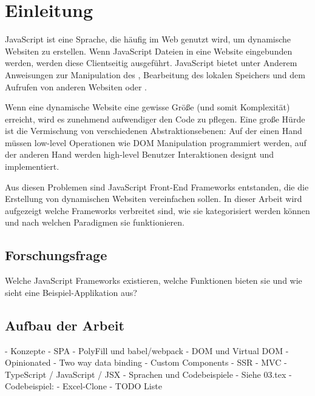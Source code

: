 \newpage
\section{Einleitung} \label{Einleitung}

JavaScript ist eine Sprache, die häufig im Web genutzt wird, um dynamische
Websiten zu erstellen. Wenn JavaScript Dateien in eine Website eingebunden
werden, werden diese Clientseitig ausgeführt. JavaScript bietet unter Anderem
Anweisungen zur Manipulation des , Bearbeitung des lokalen Speichers und dem
Aufrufen von anderen Websiten oder .

Wenn eine dynamische Website eine gewisse Größe (und somit Komplexität)
erreicht, wird es zunehmend aufwendiger den Code zu pflegen. Eine große Hürde
ist die Vermischung von verschiedenen Abstraktionsebenen: Auf der einen Hand
müssen low-level Operationen wie DOM Manipulation programmiert werden, auf der
anderen Hand werden high-level Benutzer Interaktionen designt und implementiert.

Aus diesen Problemen sind JavaScript Front-End Frameworks entstanden, die die
Erstellung von dynamischen Websiten vereinfachen sollen. In dieser Arbeit wird
aufgezeigt welche Frameworks verbreitet sind, wie sie kategorisiert werden
können und nach welchen Paradigmen sie funktionieren.

\subsection{Forschungsfrage}

Welche JavaScript Frameworks existieren, welche Funktionen bieten sie und wie
sieht eine Beispiel-Applikation aus?

\subsection{Aufbau der Arbeit}

- Konzepte
  - SPA
  - PolyFill und babel/webpack
  - DOM und Virtual DOM
  - Opinionated
  - Two way data binding
  - Custom Components
  - SSR
  - MVC
  - TypeScript / JavaScript / JSX
- Sprachen und Codebeispiele
  - Siehe 03.tex
  - Codebeispiel:
    - Excel-Clone
    - TODO Liste
